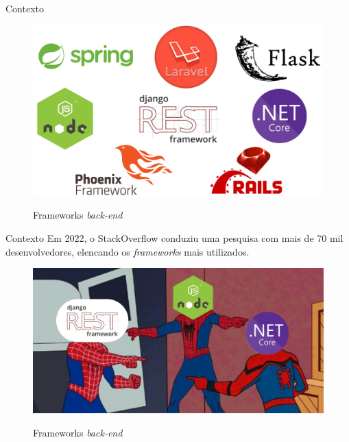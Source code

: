 \documentclass{libs/ufc_format}
\begin{document}
\begin{frame}{Contexto}
    \begin{figure}[H]
        \centering
        \caption{Frameworks \textit{back-end}}
        \includegraphics[width=0.9\linewidth]{figuras/tech-backend.pdf}
        \captionsetup{justification=centering}
        \label{fig:tech-backend}    
    \end{figure}
\end{frame}

\begin{frame}{Contexto}
    Em 2022, o StackOverflow conduziu uma pesquisa com mais de 70 mil desenvolvedores, elencando os \textit{frameworks} mais utilizados\nocite{StackOverflowSurvey}\let\thefootnote\relax{}.
    \begin{figure}[H]
        \centering
        \caption{Frameworks \textit{back-end}}
        \includegraphics[width=0.9\linewidth]{figuras/spider.pdf}
        \captionsetup{justification=centering}
        \label{fig:tech-backend2}    
    \end{figure}
\end{frame}
\end{document}
